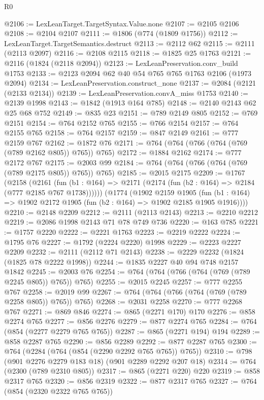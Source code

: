 \begin{lexlean}{R0}
\begin{coremodule}
{{{{{@2106 := LexLeanTarget.TargetSyntax.Value.none
@2107 := @2105 @2106
@2108 := @2104 @2107
@2111 := @1806 (@774 (@1809 @1756))
@2112 := LexLeanTarget.TargetSemantics.destruct
@2113 := @2112 @62
@2115 := @2111 (@2113 @2097)
@2116 := @2108 @2115
@2118 := @1825 @25 @1763
@2121 := @2116 (@1824 (@2118 @2094))
@2123 := LexLeanPreservation.conv_build @1753
@2133 := @2123 @2094 @62 @40 @54 @765 @765 @1763 @2106 (@1973 @2094)
@2134 := LexLeanPreservation.construct_none
@2137 := @2084 (@2121 (@2133 @2134))
@2139 := LexLeanPreservation.convA_miss @1753
@2140 := @2139 @1998
@2143 := @1842 (@1913 @164 @785)
@2148 := @2140 @2143 @62 @25 @68 @752
@2149 := @835 @23
@2151 := @789 @2149 @805
@2152 := @769 @2151
@2154 := @764 @2152 @765
@2155 := @766 @2154
@2157 := @764 @2155 @765
@2158 := @764 @2157
@2159 := @847 @2149
@2161 := @777 @2159 @767
@2162 := @1872 @76
@2171 := @764 (@764 (@766 (@764 (@769 (@789 @2162 @805)) @765)) @765)
@2172 := @1884 @2162
@2174 := @777 @2172 @767
@2175 := @2003 @99
@2184 := @764 (@764 (@766 (@764 (@769 (@789 @2175 @805)) @765)) @765)
@2185 := @2015 @2175
@2209 := @1767
    (@2158
      (@2161 (fun (b1 : @164) => @2171 (@2174 (fun (b2 : @164) => @2184 (@777 @2185 @767 @1738))))))
    (@1774
      (@1902
        @2159
        @1905
        (fun (b1 : @164) => @1902 @2172 @1905 (fun (b2 : @164) => @1902 @2185 @1905 @1916))))
@2210 := @2148 @2209
@2212 := @2111 (@2113 @2143)
@2213 := @2210 @2212
@2219 := @2086 @1998 @2143 @71 @78 @749 @736
@2220 := @163 @785
@2221 := @1757 @2220
@2222 := @2221 @1763
@2223 := @2219 @2222
@2224 := @1795 @76
@2227 := @1792 (@2224 @2220) @1998
@2229 := @2223 @2227 @2209
@2232 := @2111 (@2112 @71 @2143)
@2238 := @2229 @2232 (@1824 (@1825 @78 @2222 @1998))
@2244 := @1835 @2227 @40 @94 @748 @2157 @1842
@2245 := @2003 @76
@2254 := @764 (@764 (@766 (@764 (@769 (@789 @2245 @805)) @765)) @765)
@2255 := @2015 @2245
@2257 := @777 @2255 @767
@2258 := @2019 @99
@2267 := @764 (@764 (@766 (@764 (@769 (@789 @2258 @805)) @765)) @765)
@2268 := @2031 @2258
@2270 := @777 @2268 @767
@2271 := @869 @846
@2274 := @865 (@2271 @170) @170
@2276 := @858 @2274 @765
@2277 := @856 @2276
@2279 := @877 @2274 @765
@2284 := @764 (@854 (@2277 @2279 @765 @765))
@2287 := @865 (@2271 @194) @194
@2289 := @858 @2287 @765
@2290 := @856 @2289
@2292 := @877 @2287 @765
@2300 := @764 (@2284 (@764 (@854 (@2290 @2292 @765 @765)) @765))
@2310 := @798 (@901 @2276 @2279 @183 @18) (@901 @2289 @2292 @207 @18)
@2314 := @764 (@2300 (@789 @2310 @805))
@2317 := @865 (@2271 @220) @220
@2319 := @858 @2317 @765
@2320 := @856 @2319
@2322 := @877 @2317 @765
@2327 := @764 (@854 (@2320 @2322 @765 @765))
}}}}}
\end{coremodule}
\end{lexlean}
